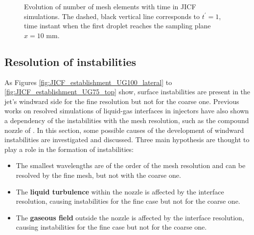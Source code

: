 \begin{figure}[ht]
%
   \caption[Evolution of number of mesh elements with time in JICF simulations]{Evolution of number of mesh elements with time in JICF simulations. The dashed, black vertical line corresponds to $t^\prime = 1$, time instant when the first droplet reaches the sampling plane $x = 10$ mm.}
\label{fig:JICF_nelem_increase}
\end{figure}


\subsection{Resolution of instabilities}
\label{subsec:ch5_instabilities_presence}

As Figures \ref{fig:JICF_establishment_UG100_lateral} to \ref{fig:JICF_establishment_UG75_top} show, surface instabilities are present in the jet's windward side for the fine resolution but not for the coarse one. Previous works on resolved simulations of liquid-gas interfaces in injectors have also shown a dependency of the instabilities with the mesh resolution, such as the compound nozzle of . In this section, some possible causes of the development of windward instabilities are investigated and discussed. Three main hypothesis are thought to play a role in the formation of instabilities:

\begin{itemize}

	\item The smallest wavelengths are of the order of the mesh resolution and can be resolved by the fine mesh, but not with the coarse one.
	
	\item The \textbf{liquid turbulence} within the nozzle is affected by the interface resolution, causing instabilities for the fine case but not for the coarse one.
	
	\item The \textbf{gaseous field} outside the nozzle is affected by the interface resolution, causing instabilities for the fine case but not for the coarse one.

\end{itemize}

